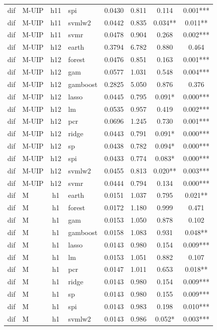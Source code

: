 \begin{ThreePartTable}
\begin{longtable}[t]{llclcccc}
dif & M-UIP & h11 & spi & 0.0430 & 0.811 & 0.114 & 0.001***\\
dif & M-UIP & h11 & svmlw2 & 0.0442 & 0.835 & 0.034** & 0.011**\\
dif & M-UIP & h11 & svmr & 0.0478 & 0.904 & 0.268 & 0.002***\\
\addlinespace
dif & M-UIP & h12 & earth & 0.3794 & 6.782 & 0.880 & 0.464\\
dif & M-UIP & h12 & forest & 0.0476 & 0.851 & 0.163 & 0.001***\\
dif & M-UIP & h12 & gam & 0.0577 & 1.031 & 0.548 & 0.004***\\
dif & M-UIP & h12 & gamboost & 0.2825 & 5.050 & 0.876 & 0.376\\
dif & M-UIP & h12 & lasso & 0.0445 & 0.795 & 0.091* & 0.000***\\
dif & M-UIP & h12 & lm & 0.0535 & 0.957 & 0.419 & 0.002***\\
dif & M-UIP & h12 & pcr & 0.0696 & 1.245 & 0.730 & 0.001***\\
dif & M-UIP & h12 & ridge & 0.0443 & 0.791 & 0.091* & 0.000***\\
dif & M-UIP & h12 & sp & 0.0438 & 0.782 & 0.094* & 0.000***\\
dif & M-UIP & h12 & spi & 0.0433 & 0.774 & 0.083* & 0.000***\\
dif & M-UIP & h12 & svmlw2 & 0.0455 & 0.813 & 0.020** & 0.003***\\
dif & M-UIP & h12 & svmr & 0.0444 & 0.794 & 0.134 & 0.000***\\
\addlinespace
dif & M & h1 & earth & 0.0151 & 1.037 & 0.795 & 0.021**\\
dif & M & h1 & forest & 0.0172 & 1.180 & 0.999 & 0.471\\
dif & M & h1 & gam & 0.0153 & 1.050 & 0.878 & 0.102\\
dif & M & h1 & gamboost & 0.0158 & 1.083 & 0.931 & 0.048**\\
dif & M & h1 & lasso & 0.0143 & 0.980 & 0.154 & 0.009***\\
dif & M & h1 & lm & 0.0153 & 1.051 & 0.882 & 0.107\\
dif & M & h1 & pcr & 0.0147 & 1.011 & 0.653 & 0.018**\\
dif & M & h1 & ridge & 0.0143 & 0.980 & 0.154 & 0.009***\\
dif & M & h1 & sp & 0.0143 & 0.980 & 0.155 & 0.009***\\
dif & M & h1 & spi & 0.0143 & 0.983 & 0.198 & 0.010***\\
dif & M & h1 & svmlw2 & 0.0143 & 0.986 & 0.052* & 0.003***\\

\end{longtable}
\end{ThreePartTable}
